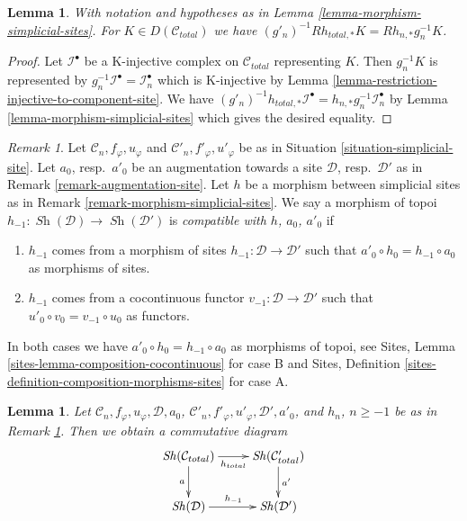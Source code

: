 \documentclass{stacks-project}
\theoremstyle{plain}
\newtheorem{lemma}[subsection]{Lemma}
\theoremstyle{definition}
\theoremstyle{remark}
\newtheorem{remark}[subsection]{Remark}
\numberwithin{equation}{subsection}
\def\Sh{\mathop{\mathit{Sh}}\nolimits}
\begin{document}
\begin{lemma}
\label{lemma-direct-image-morphism-simplicial-sites}
With notation and hypotheses as in Lemma \ref{lemma-morphism-simplicial-sites}.
For $K \in D(\mathcal{C}_{total})$ we have
$(g'_n)^{-1}Rh_{total, *}K = Rh_{n, *}g_n^{-1}K$.
\end{lemma}

\begin{proof}
Let $\mathcal{I}^\bullet$ be a K-injective complex on $\mathcal{C}_{total}$
representing $K$. Then $g_n^{-1}K$ is represented by
$g_n^{-1}\mathcal{I}^\bullet = \mathcal{I}_n^\bullet$
which is K-injective by
Lemma \ref{lemma-restriction-injective-to-component-site}.
We have $(g'_n)^{-1}h_{total, *}\mathcal{I}^\bullet =
h_{n, *}g_n^{-1}\mathcal{I}_n^\bullet$ by
Lemma \ref{lemma-morphism-simplicial-sites}
which gives the desired equality.
\end{proof}

\begin{remark}
\label{remark-morphism-augmentation-simplicial-sites}
Let $\mathcal{C}_n, f_\varphi, u_\varphi$ and
$\mathcal{C}'_n, f'_\varphi, u'_\varphi$ be as in
Situation \ref{situation-simplicial-site}.
Let $a_0$, resp.\ $a'_0$ be an augmentation
towards a site $\mathcal{D}$, resp.\ $\mathcal{D}'$
as in Remark \ref{remark-augmentation-site}.
Let $h$ be a morphism between simplicial sites as in
Remark \ref{remark-morphism-simplicial-sites}.
We say a morphism of topoi $h_{-1} : \Sh(\mathcal{D}) \to \Sh(\mathcal{D}')$
is {\it compatible with $h$, $a_0$, $a'_0$} if
\begin{enumerate}
\item[(A)] $h_{-1}$ comes from a morphism of sites
$h_{-1} : \mathcal{D} \to \mathcal{D}'$
such that $a'_0 \circ h_0 = h_{-1} \circ a_0$
as morphisms of sites.
\item[(B)] $h_{-1}$ comes from a cocontinuous functor
$v_{-1} : \mathcal{D} \to \mathcal{D}'$
such that $u'_0 \circ v_0 = v_{-1} \circ u_0$
as functors.
\end{enumerate}
In both cases we have $a'_0 \circ h_0 = h_{-1} \circ a_0$
as morphisms of topoi, see
Sites, Lemma \ref{sites-lemma-composition-cocontinuous}
for case B and Sites,
Definition \ref{sites-definition-composition-morphisms-sites}
for case A.
\end{remark}

\begin{lemma}
\label{lemma-morphism-augmentation-simplicial-sites}
Let $\mathcal{C}_n, f_\varphi, u_\varphi, \mathcal{D}, a_0$,
$\mathcal{C}'_n, f'_\varphi, u'_\varphi, \mathcal{D}', a'_0$, and
$h_n$, $n \geq -1$ be as in
Remark \ref{remark-morphism-augmentation-simplicial-sites}.
Then we obtain a commutative diagram
$$
\xymatrix{
\Sh(\mathcal{C}_{total}) \ar[d]_a \ar[r]_{h_{total}} &
\Sh(\mathcal{C}'_{total}) \ar[d]^{a'} \\
\Sh(\mathcal{D}) \ar[r]^{h_{-1}} &
\Sh(\mathcal{D}')
}
$$
\end{lemma}
\end{document}

